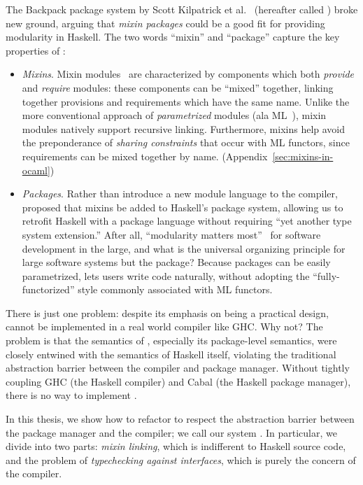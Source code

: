 The Backpack package system by Scott Kilpatrick et al.~\cite{backpack}
(hereafter called \OldBackpack{}) broke new ground, arguing that \emph{mixin
packages} could be a good fit for providing modularity in Haskell.
The two words ``mixin'' and ``package'' capture the key properties of \OldBackpack{}:

\begin{itemize}
    \item \emph{Mixins}. Mixin modules~\cite{bracha+:modularity,ancona+:cms,flatt+:units,duggan:mixin} are characterized by components which both \emph{provide} and \emph{require}
    modules:  these components can be ``mixed'' together, linking
    together provisions and requirements which have
    the same name.  Unlike the more conventional approach of
    \emph{parametrized} modules (ala ML~\cite{milner+:def-of-sml-revised}),
    mixin modules natively support recursive linking.
    Furthermore, mixins help avoid
    the preponderance of \emph{sharing constraints} that occur with ML
    functors, since requirements can be mixed together by name.  (Appendix~\ref{sec:mixins-in-ocaml})

    \item \emph{Packages}. Rather than introduce a new module language
    to the compiler, \OldBackpack{} proposed that mixins be added to
    Haskell's package system, allowing us to retrofit Haskell with
    a package language without requiring ``yet another type system extension.''
    After all, ``modularity matters most''~\cite{mmm} for software development in
    the large, and what is the universal organizing principle for large
    software systems but the package?  Because packages can be easily
    parametrized, \OldBackpack{} lets users write code naturally, without
    adopting the ``fully-functorized'' style
    commonly associated with ML functors.
\end{itemize}
%
There is just one problem: despite its emphasis on being a practical
design, \OldBackpack{} cannot be implemented in a real world compiler
like GHC\@.  Why not? The problem is that the
semantics of \OldBackpack{}, especially its package-level semantics,
were closely entwined with the semantics of Haskell itself,  violating
the traditional abstraction barrier between the compiler and package
manager.  Without tightly coupling GHC (the Haskell compiler) and Cabal
(the Haskell package manager), there is no way to implement
\OldBackpack{}.

In this thesis, we show how to refactor
\OldBackpack{} to respect the abstraction barrier between the package
manager and the compiler; we call our system \Backpack{}.  In
particular, we divide \Backpack{} into two parts: \emph{mixin linking},
which is indifferent to Haskell source code, and the problem of
\emph{typechecking against interfaces}, which is purely the concern of
the compiler.

